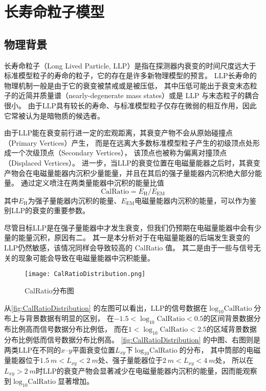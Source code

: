
\chapter{长寿命粒子模型}

\section{物理背景}
长寿命粒子（Long Lived Particle, LLP）是指在探测器内衰变的时间尺度远大于标准模型粒子的寿命的粒子，它的存在是许多新物理模型的预言。
LLP长寿命的物理机制一般是由于它的衰变被禁戒或是被压低，
其中压低可能出于衰变末态粒子的近简并质量谱（nearly-degenerate mass states）或是 LLP 与末态粒子的耦合很小。
由于LLP具有较长的寿命、与标准模型粒子仅存在微弱的相互作用，因此它常被认为是暗物质的候选者。

由于LLP能在衰变前行进一定的宏观距离，其衰变产物不会从原始碰撞点（Primary Vertices）产生，
而是在远离大多数标准模型粒子产生的初级顶点处形成一个次级顶点（Secondary Vertices），
该顶点也被称为偏离对撞顶点（Displaced Vertices）。
进一步，当LLP的衰变位置在电磁量能器之后时，其衰变产物会在电磁量能器内沉积少量能量，并且在其后的强子量能器内沉积绝大部分能量。
通过定义喷注在两类量能器中沉积的能量比值$$\text{CalRatio}=E_{\text{H}}/E_{\text{EM}}$$
其中$E_{\text{H}}$为强子量能器内沉积的能量、$E_{\text{EM}}$电磁量能器内沉积的能量，可以作为鉴别LLP的衰变的重要参数。
\cite{calratio}

尽管目标LLP是在强子量能器中才发生衰变，但我们仍预期在电磁量能器中会有少量的能量沉积，原因有二。
其一是本分析对于在电磁量能器的后端发生衰变的LLP仍然敏感，该情况同样会导致较高的 CalRatio 值。
其二是由于一些与信号无关的现象可能会导致在电磁量能器中沉积能量。

\begin{figure}[ht]
    \centering
    \texttt{[image: CalRatioDistribution.png]}
    \caption{CalRatio分布图\cite{ATLAS:2022zhj}}
    \label{fig:CalRatioDistribution}
\end{figure}

从\autoref{fig:CalRatioDistribution} 的左图可以看出，LLP的信号数据在$\log_{10}\text{CalRatio}$分布上与背景数据有明显的区别，
在$-1.5<\log_{10}\text{CalRatio}<0.5$的区间背景数据分布比例高而信号数据分布比例低，
而在$1<\log_{10}\text{CalRatio}<2.5$的区域背景数据分布比例低而信号数据分布比例高。
\autoref{fig:CalRatioDistribution} 的中图、右图则是两类LLP在不同的$x$--$y$平面衰变位置$L_{xy}$下$\log_{10}\text{CalRatio}$的分布，
其中筒部的电磁量能器位于$\SI{1.5}{m} < L_{xy} < \SI{2}{m}$处、强子量能器位于$\SI{2}{m} < L_{xy} < \SI{4}{m}$处，
所以在$L_{xy} > \SI{2}{m}$时LLP的衰变产物会显著减少在电磁量能器内沉积的能量，因而能观察到$\log_{10}\text{CalRatio}$显著增加。

